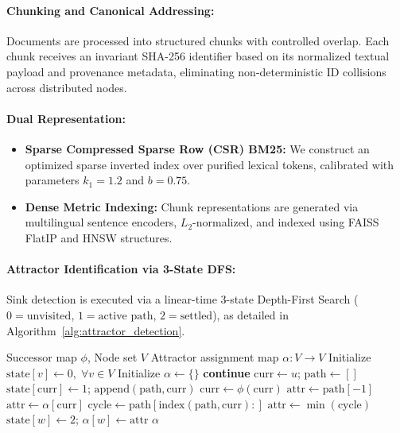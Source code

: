 \documentclass[10pt,twocolumn]{article}
\theoremstyle{definition}
\begin{document}
\paragraph{Chunking and Canonical Addressing:} Documents are processed into structured chunks with controlled overlap. Each chunk receives an invariant SHA-256 identifier based on its normalized textual payload and provenance metadata, eliminating non-deterministic ID collisions across distributed nodes.

\paragraph{Dual Representation:}
\begin{itemize}
    \item \textbf{Sparse Compressed Sparse Row (CSR) BM25:} We construct an optimized sparse inverted index over purified lexical tokens, calibrated with parameters $k_1 = 1.2$ and $b = 0.75$.
    \item \textbf{Dense Metric Indexing:} Chunk representations are generated via multilingual sentence encoders, $L_2$-normalized, and indexed using FAISS FlatIP and HNSW structures.
\end{itemize}

\paragraph{Attractor Identification via 3-State DFS:}
Sink detection is executed via a linear-time 3-state Depth-First Search ($0 = \text{unvisited}$, $1 = \text{active path}$, $2 = \text{settled}$), as detailed in Algorithm~\ref{alg:attractor_detection}.

\begin{algorithm}[t]
\caption{3-State Attractor Detection}
\label{alg:attractor_detection}
\small
\begin{algorithmic}[1]
\Require Successor map $\phi$, Node set $V$
\Ensure Attractor assignment map $\alpha: V \to V$
\State Initialize $\text{state}[v] \gets 0, \; \forall v \in V$
\State Initialize $\alpha \gets \{\}$
     \textbf{continue} \EndIf
    \State $\text{curr} \gets u$; $\text{path} \gets []$
        \State $\text{state}[\text{curr}] \gets 1$; $\text{append}(\text{path}, \text{curr})$
        \State $\text{curr} \gets \phi(\text{curr})$
    \EndWhile
        \State $\text{attr} \gets \text{path}[-1]$
        \State $\text{attr} \gets \alpha[\text{curr}]$
        \State $\text{cycle} \gets \text{path}[\text{index}(\text{path}, \text{curr}):]$
        \State $\text{attr} \gets \min(\text{cycle})$
    \EndIf
        \State $\text{state}[w] \gets 2$; $\alpha[w] \gets \text{attr}$
    \EndFor
\EndFor
\State \Return $\alpha$
\end{algorithmic}
\end{algorithm}
\end{document}
